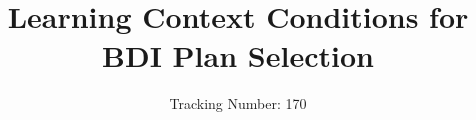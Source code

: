 \documentclass{aamas2010}
\begin{document}




\title{Learning Context Conditions for BDI Plan Selection}

\author{Tracking Number: 170}


%
%
%
%

%


%
\end{document}
